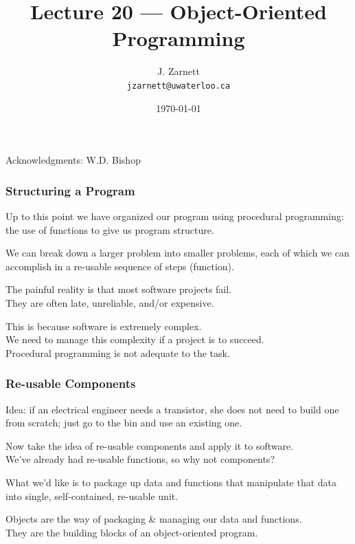 

\title{Lecture 20 --- Object-Oriented Programming }

\author{J. Zarnett\\
\texttt{jzarnett@uwaterloo.ca}}
\date{\today}



\begin{frame}
  \titlepage
  
  \begin{center}
  \small{Acknowledgments: W.D. Bishop}
  \end{center}
\end{frame}



\begin{frame}
\frametitle{Structuring a Program}

Up to this point we have organized our program using procedural programming: the use of functions to give us program structure.

We can break down a larger problem into smaller problems, each of which we can accomplish in a re-usable sequence of steps (function).

The painful reality is that most software projects fail.\\
\quad They are often late, unreliable, and/or expensive.

This is because software is extremely complex.\\
\quad We need to manage this complexity if a project is to succeed.\\
\quad Procedural programming is not adequate to the task.

\end{frame}

\begin{frame}
\frametitle{Re-usable Components}

Idea: if an electrical engineer needs a transistor, she does not need to build one from scratch; just go to the bin and use an existing one.

Now take the idea of re-usable components and apply it to software.\\
\quad We've already had re-usable functions, so why not components?

What we'd like is to package up data and functions that manipulate that data into single, self-contained, re-usable unit.

\alert{Objects} are the way of packaging \& managing our data and functions.\\
\quad They are the building blocks of an object-oriented program.

\end{frame}

